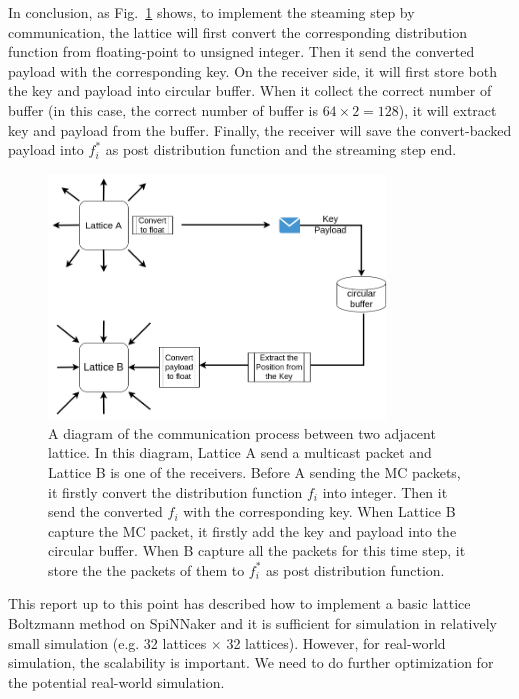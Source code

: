 In conclusion, as Fig.~\ref{fig:communicate} shows, to implement the steaming step by communication, the lattice will first convert the corresponding distribution function from floating-point to unsigned integer. Then it send the converted payload with the corresponding key. On the receiver side, it will first store both the key and payload into circular buffer. When it collect the correct number of buffer (in this case, the correct number of buffer is $64\times2 = 128$), it will extract key and payload from the buffer. Finally, the receiver will save the convert-backed payload into $f_i^*$ as post distribution function and the streaming step end.\\
\begin{figure}[tb]
   \centering
       \includegraphics[width=0.8\textwidth]{figures/communication.png}
       \caption{A diagram of the communication process between two adjacent lattice. In this diagram, Lattice A send a multicast packet and Lattice B is one of the receivers. Before A sending the MC packets, it firstly convert the distribution function $f_i$ into integer. Then it send the converted $f_i$ with the corresponding key. When Lattice B capture the MC packet, it firstly add the key and payload into the circular buffer. When B capture all the packets for this time step, it store the the packets of them to $f_i^*$ as post distribution function.}
       \label{fig:communicate}
\end{figure}

This report up to this point has described how to implement a basic lattice Boltzmann method on SpiNNaker and it is sufficient for simulation in relatively small simulation (e.g. 32 lattices $\times$ 32 lattices). However, for real-world simulation, the scalability is important. We need to do further optimization for the potential real-world simulation.\\

